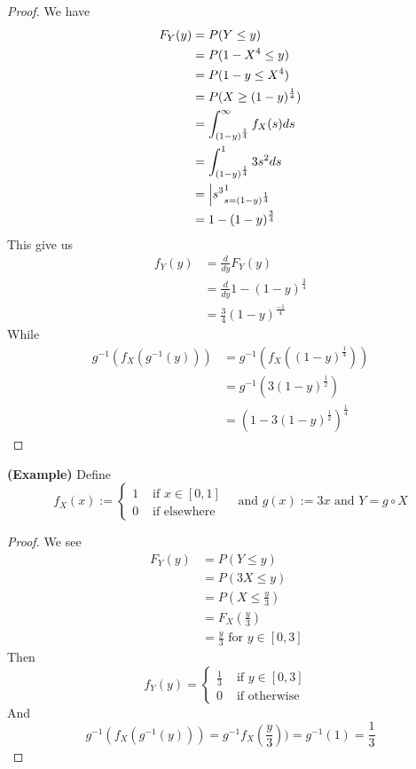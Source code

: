 \documentclass{report}
\begin{document}
\begin{proof}
We have
\begin{align}
F_Y(y)&=P(Y\leq y)\\
&=P(1-X^4\leq y)\\
&=P(1-y\leq X^4)\\
&=P(X\geq (1-y)^{\frac{1}{4}})\\
&=\int_{(1-y)^{\frac{1}{4}}}^\infty f_X(s)ds\\
&=\int_{(1-y)^{\frac{1}{4}}}^1 3s^2ds\\
&= \Big |{s^3}_{s=(1-y)^{\frac{1}{4}}}^1\\
&=1-(1-y)^{\frac{3}{4}}
\end{align}
This give us
\begin{align}
f_Y(y)&=\frac{d}{dy}F_Y(y)\\
&=\frac{d}{dy}1-(1-y)^{\frac{3}{4}}\\
&=\frac{3}{4}(1-y)^{\frac{-1}{4}}
\end{align}
While 
\begin{align}
g^{-1}(f_X(g^{-1}(y)))&= g^{-1}(f_X((1-y)^{\frac{1}{4}}))\\
&=g^{-1}(3(1-y)^{\frac{1}{2}})\\
&=(1-3(1-y)^{\frac{1}{2}})^{\frac{1}{4}}
\end{align}

\end{proof}
\begin{theorem}
\label{2.1.12}
\textbf{(Example)} Define 
\begin{equation}
f_X(x):=\begin{cases}
  1& \text{ if $x\in [0,1]$ }\\
  0& \text{ if elsewhere }
\end{cases}\text{ and }g(x):=3x\text{ and }Y=g\circ X
\end{equation}
\end{theorem}
\begin{proof}
We see 
\begin{align}
F_Y(y)&=P(Y\leq y)\\
&=P(3X\leq y)\\
&=P(X\leq \frac{y}{3})\\
&=F_X(\frac{y}{3})\\
&=\frac{y}{3}\text{ for $y\in [0,3]$ }
\end{align}
Then 
\begin{equation}
f_Y(y)=\begin{cases}
  \frac{1}{3}& \text{ if $y\in [0,3]$ }\\
  0& \text{ if otherwise }
\end{cases}
\end{equation}
And
\begin{equation}
g^{-1}(f_X(g^{-1}(y)))=g^{-1}f_X(\frac{y}{3}))=g^{-1}(1)=\frac{1}{3}
\end{equation}
\end{proof}
\end{document}
